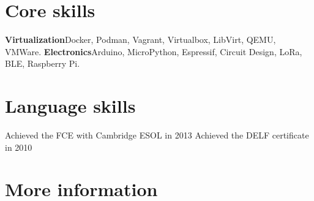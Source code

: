 \section{Core skills}
    {\textbf{Virtualization}}{Docker, Podman, Vagrant, Virtualbox, LibVirt, QEMU, VMWare.}
    {\textbf{Electronics}}{Arduino, MicroPython, Espressif, Circuit Design, LoRa, BLE, Raspberry Pi.}

\section{Language skills}
    {Achieved the FCE with Cambridge ESOL in 2013}
    {Achieved the DELF certificate in 2010}
    {}

\pagebreak

\section{More information}
    \vspace{-0.1cm}
    \sethintscolumnlength{2cm}
